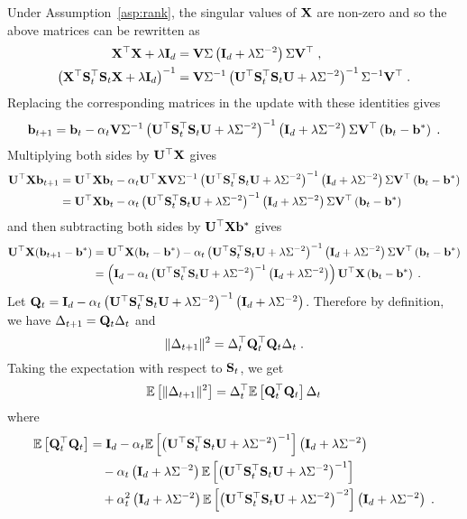 Under Assumption~\ref{asp:rank}, the singular values of $\mathbf{X}$ are non-zero and so the above matrices can be rewritten as
\begin{align*}
\mathbf{X}^\top\mathbf{X}+\lambda\mathbf{I}_d &= \mathbf{V}\Sigma\left(\mathbf{I}_d + \lambda\Sigma^{-2}\right)\Sigma\mathbf{V}^\top \;, \\
\left(\mathbf{X}^\top\mathbf{S}_t^\top\mathbf{S}_t\mathbf{X} + \lambda\mathbf{I}_d\right)^{-1} &= \mathbf{V}\Sigma^{-1}\left(\mathbf{U}^\top\mathbf{S}_t^\top\mathbf{S}_t\mathbf{U} + \lambda\Sigma^{-2}\right)^{-1}\Sigma^{-1}\mathbf{V}^\top \;.
\end{align*}
Replacing the corresponding matrices in the update with these identities gives
\[
\mathbf{b}_{t+1} = \mathbf{b}_t - \alpha_t\mathbf{V}\Sigma^{-1}\left(\mathbf{U}^\top\mathbf{S}_t^\top\mathbf{S}_t\mathbf{U} + \lambda\Sigma^{-2}\right)^{-1}\left(\mathbf{I}_d + \lambda\Sigma^{-2} \right)\Sigma\mathbf{V}^\top\left(\mathbf{b}_t-\mathbf{b}^*\right) \;.
\]
Multiplying both sides by $\mathbf{U}^\top\mathbf{X}$ gives
\begin{align*}
\mathbf{U}^\top\mathbf{X}\mathbf{b}_{t+1} &= \mathbf{U}^\top\mathbf{X}\mathbf{b}_t - \alpha_t\mathbf{U}^\top\mathbf{X}\mathbf{V}\Sigma^{-1}\left(\mathbf{U}^\top\mathbf{S}_t^\top\mathbf{S}_t\mathbf{U} + \lambda\Sigma^{-2}\right)^{-1}\left(\mathbf{I}_d + \lambda\Sigma^{-2} \right)\Sigma\mathbf{V}^\top\left(\mathbf{b}_t-\mathbf{b}^*\right) \\
&= \mathbf{U}^\top\mathbf{X}\mathbf{b}_t - \alpha_t\left(\mathbf{U}^\top\mathbf{S}_t^\top\mathbf{S}_t\mathbf{U} + \lambda\Sigma^{-2}\right)^{-1}\left(\mathbf{I}_d + \lambda\Sigma^{-2} \right)\Sigma\mathbf{V}^\top\left(\mathbf{b}_t-\mathbf{b}^*\right)
\end{align*}
and then subtracting both sides by $\mathbf{U}^\top\mathbf{X}\mathbf{b}^*$ gives
\begin{align*}
\mathbf{U}^\top\mathbf{X}(\mathbf{b}_{t+1}-\mathbf{b}^*) &= \mathbf{U}^\top\mathbf{X}(\mathbf{b}_t-\mathbf{b}^*) - \alpha_t\left(\mathbf{U}^\top\mathbf{S}_t^\top\mathbf{S}_t\mathbf{U} + \lambda\Sigma^{-2}\right)^{-1}\left(\mathbf{I}_d + \lambda\Sigma^{-2} \right)\Sigma\mathbf{V}^\top\left(\mathbf{b}_t-\mathbf{b}^*\right) \\
&= \left(\mathbf{I}_d - \alpha_t\left(\mathbf{U}^\top\mathbf{S}_t^\top\mathbf{S}_t\mathbf{U} + \lambda\Sigma^{-2}\right)^{-1}\left(\mathbf{I}_d + \lambda\Sigma^{-2}\right)\right)\mathbf{U}^\top\mathbf{X}\left(\mathbf{b}_t-\mathbf{b}^*\right) \;.
\end{align*}
Let $\mathbf{Q}_t=\mathbf{I}_d - \alpha_t\left(\mathbf{U}^\top\mathbf{S}_t^\top\mathbf{S}_t\mathbf{U} + \lambda\Sigma^{-2}\right)^{-1}\left(\mathbf{I}_d + \lambda\Sigma^{-2}\right)$. Therefore by definition, we have $\Delta_{t+1} = \mathbf{Q}_t\Delta_t$ and
\[
\|\Delta_{t+1}\|^2 = \Delta_t^\top\mathbf{Q}_t^\top\mathbf{Q}_t\Delta_t \;.
\]
Taking the expectation with respect to $\mathbf{S}_t$, we get
\[
\mathbb{E}\left[\|\Delta_{t+1}\|^2\right] = \Delta_t^\top\mathbb{E}\left[\mathbf{Q}_t^\top\mathbf{Q}_t\right]\Delta_t
\]
where
\begin{align*}
\mathbb{E}\left[\mathbf{Q}_t^\top\mathbf{Q}_t\right] &= \mathbf{I}_d - \alpha_t\mathbb{E}\left[\left(\mathbf{U}^\top\mathbf{S}_t^\top\mathbf{S}_t\mathbf{U} + \lambda\Sigma^{-2}\right)^{-1}\right]\left(\mathbf{I}_d + \lambda\Sigma^{-2}\right) \\
&\quad - \alpha_t\left(\mathbf{I}_d + \lambda\Sigma^{-2}\right)\mathbb{E}\left[\left(\mathbf{U}^\top\mathbf{S}_t^\top\mathbf{S}_t\mathbf{U} + \lambda\Sigma^{-2}\right)^{-1}\right] \\
&\quad + \alpha_t^2\left(\mathbf{I}_d + \lambda\Sigma^{-2}\right)\mathbb{E}\left[\left(\mathbf{U}^\top\mathbf{S}_t^\top\mathbf{S}_t\mathbf{U} + \lambda\Sigma^{-2}\right)^{-2}\right]\left(\mathbf{I}_d + \lambda\Sigma^{-2}\right) \;.
\end{align*}
